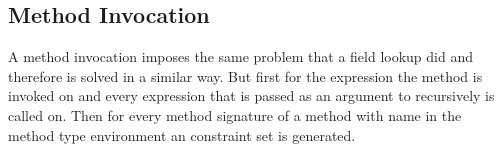 \subsection{Method Invocation}
A method invocation imposes the same problem that a field lookup did and therefore is solved in a similar way. But first for the
expression the method  is invoked on and every expression that is passed as an argument to  
recursively is called on. Then for every method signature of a method with name  in the method type environment an constraint set is generated.
